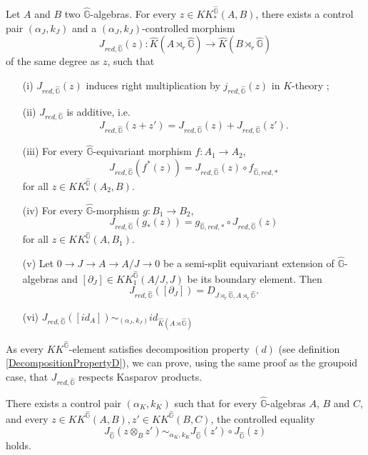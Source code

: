 \begin{prop}
Let $A$ and $B$ two $\hat{\mathbb G}$-algebras. For every $z\in KK^{\hat{\mathbb G}}_*(A,B)$, there exists a control pair $(\alpha_J,k_J)$ and a $(\alpha_J,k_J)$-controlled morphism
\[J_{red,\hat{\mathbb G}}(z) : \hat K(A\rtimes_r \hat{\mathbb G})\rightarrow \hat K(B\rtimes_r \hat{\mathbb G})\]
of the same degree as $z$, such that
\begin{enumerate}
\item[(i)] $J_{red,\hat{\mathbb G}}(z)$ induces right multiplication by $j_{red,\hat{\mathbb G}}(z)$ in $K$-theory ;
\item[(ii)] $J_{red,\hat{\mathbb G}}$ is additive, i.e.
\[J_{red,\hat{\mathbb G}}(z+z')=J_{red,\hat{\mathbb G}}(z)+J_{red,\hat{\mathbb G}}(z').\]
\item[(iii)] For every $\hat{\mathbb G}$-equivariant morphism $f : A_1\rightarrow A_2$,
\[J_{red,\hat{\mathbb G}}(f^*(z))=J_{red,\hat{\mathbb G}}(z)\circ f_{\hat{\mathbb G},red,*}\] for all $z\in KK_*^{\hat{\mathbb G}}(A_2,B)$.
\item[(iv)] For every $\hat{\mathbb G}$-morphism $g : B_1\rightarrow B_2$,
\[J_{red,\hat{\mathbb G}}(g_*(z))= g_{\hat{\mathbb G},red,*}\circ J_{red,\hat{\mathbb G}}(z)\] for all $z\in KK_*^{\hat{\mathbb G}}(A,B_1)$.
\item[(v)] Let $0\rightarrow J\rightarrow A\rightarrow A/J\rightarrow 0$ be a semi-split equivariant extension of $\hat{\mathbb G}$-algebras and $[\partial_J]\in KK_1^{\hat{\mathbb G}}(A/J,J)$ be its boundary element. Then 
\[J_{red,\hat{\mathbb G}}([\partial_J])=D_{J\rtimes_r \hat{\mathbb G},A\rtimes_r \hat{\mathbb G}}.\] 
\item[(vi)] $J_{red,\hat{\mathbb G}}([id_A]) \sim_{(\alpha_J,k_J)} id_{\hat K(A\rtimes \hat{\mathbb G})}$
\end{enumerate}
\end{prop}

As every $KK^{\hat{\mathbb G}}$-element satisfies decomposition property $(d)$ (see definition \ref{DecompositionPropertyD}), we can prove, using the same proof as the groupoid case, that $J_{red,\hat{\mathbb G}}$ respects Kasparov products.

\begin{prop} There exists a control pair $(\alpha_K,k_K)$ such that for every $\hat{\mathbb G}$-algebras $A$, $B$ and $C$, and every $z\in KK^{\hat{\mathbb G}}(A,B),z'\in KK^{\hat{\mathbb G}}(B,C)$, the controlled equality
\[J_{\hat{\mathbb G}}(z\otimes_B z') \sim_{\alpha_K,k_K} J_{\hat{\mathbb G}}(z')\circ J_{\hat{\mathbb G}}(z)\]
holds.
\end{prop}


